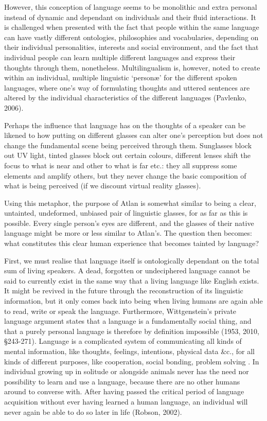 However, this conception of language seems to be monolithic and extra personal instead of dynamic and dependant on individuals and their fluid interactions. It is challenged when presented with the fact that people within the same language can have vastly different ontologies, philosophies and vocabularies, depending on their individual personalities, interests and social environment, and the fact that individual people can learn multiple different languages and express their thoughts through them, nonetheless. Multilingualism is, however, noted to create within an individual, multiple linguistic ‘personæ’ for the different spoken languages, where one’s way of formulating thoughts and uttered sentences are altered by the individual characteristics of the different languages  (Pavlenko, 2006). 

Perhaps the influence that language has on the thoughts of a speaker can be likened to how putting on different glasses can alter one’s perception but does not change the fundamental scene being perceived through them. Sunglasses block out UV light, tinted glasses block out certain colours, different lenses shift the focus to what is near and other to what is far etc.: they all suppress some elements and amplify others, but they never change the basic composition of what is being perceived (if we discount virtual reality glasses). 

Using this metaphor, the purpose of Atlan is somewhat similar to being a clear, untainted, undeformed, unbiased pair of linguistic glasses, for as far as this is possible. Every single person’s eyes are different, and the glasses of their native language might be more or less similar to Atlan’s. The question then becomes: what constitutes this clear human experience that becomes tainted by language?  

First, we must realise that language itself is ontologically dependant on the total sum of living speakers. A dead, forgotten or undeciphered language cannot be said to currently exist in the same way that a living language like English exists. It might be revived in the future through the reconstruction of its linguistic information, but it only comes back into being when living humans are again able to read, write or speak the language. Furthermore, Wittgenstein’s private language argument states that a language is a fundamentally social thing, and that a purely personal language is therefore by definition impossible (1953, 2010, \S 243-271). Language is a complicated system of communicating all kinds of mental information, like thoughts, feelings, intentions, physical data \&c., for all kinds of different purposes, like cooperation, social bonding, problem solving . In individual growing up in solitude or alongside animals never has the need nor possibility to learn and use a language, because there are no other humans around to converse with. After having passed the critical period of language acquisition without ever having learned a human language, an individual will never again be able to do so later in life (Robson, 2002).  

